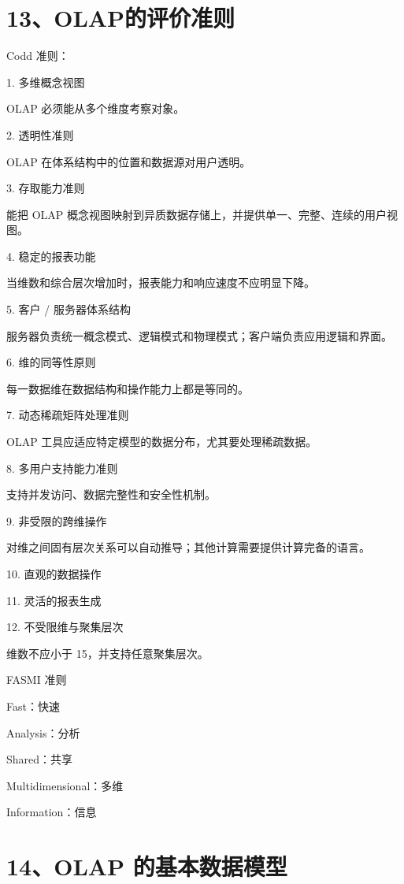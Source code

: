 \documentclass[UTF8,zihao=-4]{ctexart}
\begin{document}
\newpage
\section*{13、OLAP的评价准则}

Codd 准则：\par
1. 多维概念视图\par
OLAP 必须能从多个维度考察对象。\par
2. 透明性准则\par
OLAP 在体系结构中的位置和数据源对用户透明。\par
3. 存取能力准则\par
能把 OLAP 概念视图映射到异质数据存储上，并提供单一、完整、连续的用户视图。\par
4. 稳定的报表功能\par
当维数和综合层次增加时，报表能力和响应速度不应明显下降。\par
5. 客户 / 服务器体系结构\par
服务器负责统一概念模式、逻辑模式和物理模式；客户端负责应用逻辑和界面。\par
6. 维的同等性原则\par
每一数据维在数据结构和操作能力上都是等同的。\par
7. 动态稀疏矩阵处理准则\par
OLAP 工具应适应特定模型的数据分布，尤其要处理稀疏数据。\par
8. 多用户支持能力准则\par
支持并发访问、数据完整性和安全性机制。\par
9. 非受限的跨维操作\par
对维之间固有层次关系可以自动推导；其他计算需要提供计算完备的语言。\par
10. 直观的数据操作\par
11. 灵活的报表生成\par
12. 不受限维与聚集层次\par
维数不应小于 15，并支持任意聚集层次。\par

FASMI 准则\par

Fast：快速\par
Analysis：分析\par
Shared：共享\par
Multidimensional：多维\par
Information：信息\par

\newpage
\section*{14、OLAP 的基本数据模型}
\end{document}
